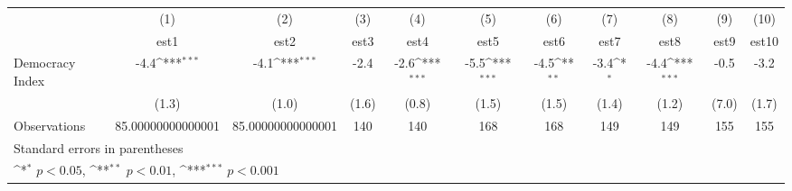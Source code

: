 {
\def\sym#1{\ifmmode^{#1}\else\(^{#1}\)\fi}
\begin{tabular}{l*{10}{c}}
\hline\hline
                    &\multicolumn{1}{c}{(1)}         &\multicolumn{1}{c}{(2)}         &\multicolumn{1}{c}{(3)}         &\multicolumn{1}{c}{(4)}         &\multicolumn{1}{c}{(5)}         &\multicolumn{1}{c}{(6)}         &\multicolumn{1}{c}{(7)}         &\multicolumn{1}{c}{(8)}         &\multicolumn{1}{c}{(9)}         &\multicolumn{1}{c}{(10)}         \\
                    &        est1         &        est2         &        est3         &        est4         &        est5         &        est6         &        est7         &        est8         &        est9         &       est10         \\
\hline
Democracy Index     &        -4.4\sym{***}&        -4.1\sym{***}&        -2.4         &        -2.6\sym{***}&        -5.5\sym{***}&        -4.5\sym{**} &        -3.4\sym{*}  &        -4.4\sym{***}&        -0.5         &        -3.2         \\
                    &       (1.3)         &       (1.0)         &       (1.6)         &       (0.8)         &       (1.5)         &       (1.5)         &       (1.4)         &       (1.2)         &       (7.0)         &       (1.7)         \\
\hline
Observations        &85.00000000000001         &85.00000000000001         &         140         &         140         &         168         &         168         &         149         &         149         &         155         &         155         \\
\hline\hline
\multicolumn{11}{l}{\footnotesize Standard errors in parentheses}\\
\multicolumn{11}{l}{\footnotesize \sym{*} \(p<0.05\), \sym{**} \(p<0.01\), \sym{***} \(p<0.001\)}\\
\end{tabular}
}
